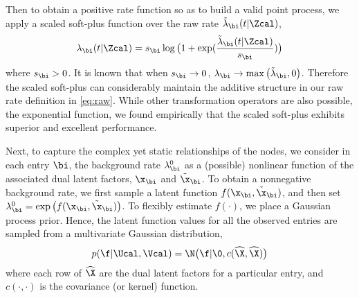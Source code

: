 

Then to obtain a positive rate function so as to build a valid point process, we  apply a scaled soft-plus function over the raw rate $\tilde{\lambda}_\bi(t|\Zcal)$, 
\begin{align}
\lambda_\bi(t|\Zcal) = s_\bi \log\big(1 + \exp(\frac{\tilde{\lambda}_\bi(t|\Zcal)}{s_\bi})\big) \label{eq:rate}
\end{align}
where $s_\bi>0$. It is known that when $s_\bi \rightarrow 0$,  $\lambda_\bi  \rightarrow \max\big(\tilde{\lambda}_\bi, 0\big)$. Therefore the scaled soft-plus can considerably maintain the additive structure in our raw rate definition in \eqref{eq:raw}. While other transformation operators are also possible, \eg the exponential function, we found empirically that the scaled soft-plus exhibits superior and excellent performance.

Next, to capture the complex yet static relationships of the nodes, we consider in each entry $\bi$, the background rate $\lambda_\bi^0$ as a (possible) nonlinear function of the associated dual latent factors, $\x_{\bi}$ and  $\tilde{\x}_{\bi}$. To obtain a nonnegative background rate, we first sample a latent function $f(\x_{\bi}, \tilde{\x}_{\bi})$, and then set $\lambda_\bi^0 = \exp\big(f(\x_{\bi}, \tilde{\x}_{\bi})\big)$. To flexibly estimate $f(\cdot)$, we place a Gaussian process prior. Hence, the latent function values for all the observed entries are  sampled from a multivariate Gaussian distribution,
\begin{align}
		p(\f|\Ucal, \Vcal) = \N\big(\f|\0, c(\widehat{\X}, \widehat{\X})\big) \label{eq:gp}
\end{align} 
where each row of $\widehat{\X}$ are the dual latent factors for a particular entry, and $c(\cdot,\cdot)$ is the covariance (or kernel) function. %

